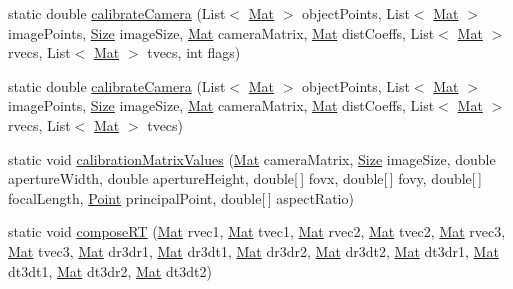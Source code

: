 \begin{DoxyCompactItemize}
\item 
static double \mbox{\hyperlink{classorg_1_1opencv_1_1calib3d_1_1_calib3d_a1cd08cb110fd228c1feac4c47e5f2129}{calibrate\+Camera}} (List$<$ \mbox{\hyperlink{classorg_1_1opencv_1_1core_1_1_mat}{Mat}} $>$ object\+Points, List$<$ \mbox{\hyperlink{classorg_1_1opencv_1_1core_1_1_mat}{Mat}} $>$ image\+Points, \mbox{\hyperlink{classorg_1_1opencv_1_1core_1_1_size}{Size}} image\+Size, \mbox{\hyperlink{classorg_1_1opencv_1_1core_1_1_mat}{Mat}} camera\+Matrix, \mbox{\hyperlink{classorg_1_1opencv_1_1core_1_1_mat}{Mat}} dist\+Coeffs, List$<$ \mbox{\hyperlink{classorg_1_1opencv_1_1core_1_1_mat}{Mat}} $>$ rvecs, List$<$ \mbox{\hyperlink{classorg_1_1opencv_1_1core_1_1_mat}{Mat}} $>$ tvecs, int flags)
\item 
static double \mbox{\hyperlink{classorg_1_1opencv_1_1calib3d_1_1_calib3d_aaa55919083e3f9e4d55ad80fac0d156d}{calibrate\+Camera}} (List$<$ \mbox{\hyperlink{classorg_1_1opencv_1_1core_1_1_mat}{Mat}} $>$ object\+Points, List$<$ \mbox{\hyperlink{classorg_1_1opencv_1_1core_1_1_mat}{Mat}} $>$ image\+Points, \mbox{\hyperlink{classorg_1_1opencv_1_1core_1_1_size}{Size}} image\+Size, \mbox{\hyperlink{classorg_1_1opencv_1_1core_1_1_mat}{Mat}} camera\+Matrix, \mbox{\hyperlink{classorg_1_1opencv_1_1core_1_1_mat}{Mat}} dist\+Coeffs, List$<$ \mbox{\hyperlink{classorg_1_1opencv_1_1core_1_1_mat}{Mat}} $>$ rvecs, List$<$ \mbox{\hyperlink{classorg_1_1opencv_1_1core_1_1_mat}{Mat}} $>$ tvecs)
\item 
static void \mbox{\hyperlink{classorg_1_1opencv_1_1calib3d_1_1_calib3d_ad9223e80b2aa0006c9ad4980cb8d36f7}{calibration\+Matrix\+Values}} (\mbox{\hyperlink{classorg_1_1opencv_1_1core_1_1_mat}{Mat}} camera\+Matrix, \mbox{\hyperlink{classorg_1_1opencv_1_1core_1_1_size}{Size}} image\+Size, double aperture\+Width, double aperture\+Height, double\mbox{[}$\,$\mbox{]} fovx, double\mbox{[}$\,$\mbox{]} fovy, double\mbox{[}$\,$\mbox{]} focal\+Length, \mbox{\hyperlink{classorg_1_1opencv_1_1core_1_1_point}{Point}} principal\+Point, double\mbox{[}$\,$\mbox{]} aspect\+Ratio)
\item 
static void \mbox{\hyperlink{classorg_1_1opencv_1_1calib3d_1_1_calib3d_ad9164834d702ee2b284bd9f5286f211d}{compose\+RT}} (\mbox{\hyperlink{classorg_1_1opencv_1_1core_1_1_mat}{Mat}} rvec1, \mbox{\hyperlink{classorg_1_1opencv_1_1core_1_1_mat}{Mat}} tvec1, \mbox{\hyperlink{classorg_1_1opencv_1_1core_1_1_mat}{Mat}} rvec2, \mbox{\hyperlink{classorg_1_1opencv_1_1core_1_1_mat}{Mat}} tvec2, \mbox{\hyperlink{classorg_1_1opencv_1_1core_1_1_mat}{Mat}} rvec3, \mbox{\hyperlink{classorg_1_1opencv_1_1core_1_1_mat}{Mat}} tvec3, \mbox{\hyperlink{classorg_1_1opencv_1_1core_1_1_mat}{Mat}} dr3dr1, \mbox{\hyperlink{classorg_1_1opencv_1_1core_1_1_mat}{Mat}} dr3dt1, \mbox{\hyperlink{classorg_1_1opencv_1_1core_1_1_mat}{Mat}} dr3dr2, \mbox{\hyperlink{classorg_1_1opencv_1_1core_1_1_mat}{Mat}} dr3dt2, \mbox{\hyperlink{classorg_1_1opencv_1_1core_1_1_mat}{Mat}} dt3dr1, \mbox{\hyperlink{classorg_1_1opencv_1_1core_1_1_mat}{Mat}} dt3dt1, \mbox{\hyperlink{classorg_1_1opencv_1_1core_1_1_mat}{Mat}} dt3dr2, \mbox{\hyperlink{classorg_1_1opencv_1_1core_1_1_mat}{Mat}} dt3dt2)

\end{DoxyCompactItemize}
